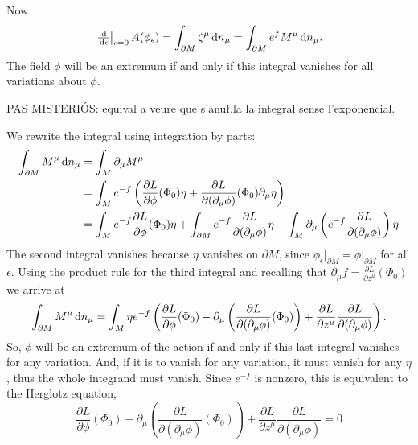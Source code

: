 \documentclass[12pt]{article}
\begin{document}
Now
\begin{equation}
	\left.\tfrac{\, \mathrm{d}}{\, \mathrm{d} \epsilon}\right\vert_{\epsilon=0} A(\phi_\epsilon) = \int_{\partial M} \zeta^\mu \, \mathrm{d} n_\mu =
	\int_{\partial M} e^{f}M^\mu \, \mathrm{d} n_\mu.
\end{equation}
The field \( \phi \) will be an extremum if and only if this integral vanishes for all
variations about \( \phi \). 

PAS MISTERIÓS: equival a veure que s'anu\l.la la integral sense l'exponencial. 

We rewrite the integral using integration by parts:
\begin{align}
	\int_{\partial M} M^\mu \, \mathrm{d} n_\mu 
	& = \int_M \partial_\mu M^\mu \\
	& = \int_M e^{-f}\left(\frac{\partial L}{\partial \phi}(\Phi_0) \eta + \frac{\partial
		L}{\partial(\partial_\mu \phi)}(\Phi_0) \partial_\mu \eta \right) \\
	& = \int_M e^{-f} \frac{\partial L}{\partial \phi}(\Phi_0) \eta
	+ \int_{\partial M} e^{-f} \frac{\partial L}{\partial(\partial_\mu \phi)} \eta
	- \int_M \partial_\mu\left(e^{-f} \frac{\partial L}{\partial(\partial_\mu
	\phi)}\right)\eta
\end{align}
The second integral vanishes because \( \eta \) vanishes on \( \partial M \), since \(
\phi_\epsilon \vert_{\partial M} = \phi\vert_{\partial M} \) for all \( \epsilon \). Using
the product rule for the third integral and recalling that \( \partial_\mu f =
\frac{\partial L}{\partial z^\mu}(\Phi_0) \) we arrive at
\begin{equation}
	\int_{\partial M} M^\mu \, \mathrm{d} n_\mu = \int_M \eta e^{-f} \left(\frac{\partial
			L}{\partial \phi}(\Phi_0) - \partial_\mu\left(\frac{\partial L}{\partial(\partial_\mu
	\phi)}(\Phi_0)\right) + \frac{\partial L}{\partial z^\mu}
\frac{\partial L}{\partial(\partial_\mu \phi)} \right).
\end{equation}
So, \( \phi \) will be an extremum of the action if and only if this last integral
vanishes for any variation. And, if it is to vanish for any variation, it must vanish for
any \( \eta \), thus the whole integrand must vanish. Since \( e^{-f} \) is nonzero, this
is equivalent to the Herglotz equation,
\begin{equation}
	\frac{\partial L}{\partial \phi}(\Phi_0) - \partial_\mu\left(\frac{\partial
	L}{\partial(\partial_\mu \phi)}(\Phi_0)\right) + \frac{\partial L}{\partial z^\mu}
	\frac{\partial L}{\partial(\partial_\mu \phi)} = 0
\end{equation}
\end{document}
